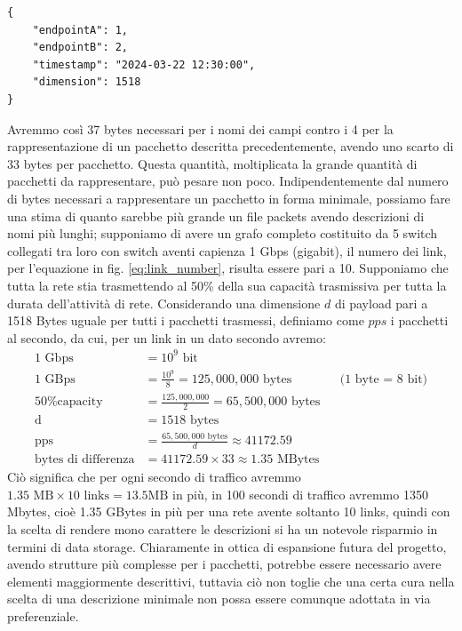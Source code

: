 \documentclass[binding=0.6cm]{sapthesis}
\begin{document}
{\scriptsize %
\begin{lstlisting}[caption={rappresentazione di un pacchetto con descrizione completa}, label={codice:long_description_packet}]
{
    "endpointA": 1,
    "endpointB": 2,
    "timestamp": "2024-03-22 12:30:00",
    "dimension": 1518
}
\end{lstlisting}
}

Avremmo così 37 bytes necessari per i nomi dei campi contro i 4 per la rappresentazione di un pacchetto descritta precedentemente, avendo uno scarto di
33 bytes per pacchetto. Questa quantità, moltiplicata la grande quantità di pacchetti da rappresentare, può pesare non poco.
Indipendentemente dal numero di bytes necessari a rappresentare un pacchetto in forma minimale, possiamo fare una stima di quanto sarebbe più grande
un file packets avendo descrizioni di nomi più lunghi; supponiamo di avere un grafo completo costituito da 5 switch collegati tra loro con switch
aventi capienza 1 Gbps (gigabit), il numero dei link, per l'equazione in fig. \ref{eq:link_number}, risulta essere pari a 10. Supponiamo che tutta la rete
stia trasmettendo al 50\% della sua capacità trasmissiva per tutta la durata dell'attività di rete. Considerando una dimensione \(d\) di payload pari 
a 1518 Bytes uguale per tutti i pacchetti trasmessi,
definiamo come \(pps\) i pacchetti al secondo, da cui, per un link in un dato secondo avremo:
\begin{align*}
    \text{1 Gbps} &= 10^9 \text{ bit}\\
    \text{1 GBps} &= \frac{10^9}{8} = 125,000,000 \text{ bytes} && \text{(1 byte = 8 bit)} \\
    \text{50\% capacity} &= \frac{125,000,000}{2} = 65,500,000 \text{ bytes}\\
    \text{d} &= 1518 \text{ bytes} \\
    \text{pps} &= \frac{65,500,000 \text{ bytes}}{d}\approx 41172.59\\
    \text{bytes di differenza} &= 41172.59 \times 33 \approx 1.35 \text{ MBytes}
\end{align*}
Ciò significa che per ogni secondo di traffico avremmo \(1.35 \text{ MB} \times 10\text{ links} = 13.5 \text{MB}\) in più, 
 in 100 secondi di traffico avremmo 1350 Mbytes, cioè 1.35 GBytes in più per una rete avente soltanto 10 links, quindi con la scelta di rendere
  mono carattere le descrizioni
 si ha un notevole risparmio in termini di data storage. Chiaramente in ottica di espansione futura del progetto, avendo strutture più complesse
 per i pacchetti, potrebbe essere necessario avere elementi maggiormente descrittivi, tuttavia ciò non toglie che una certa cura nella scelta di una 
 descrizione minimale non possa essere comunque adottata in via preferenziale.
\end{document}
